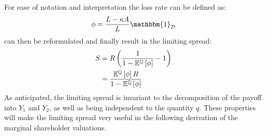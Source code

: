 \documentclass[../main.tex]{subfiles}
\begin{document}
        For ease of notation and interpretation the loss rate can be defined as:
            \begin{equation}
                \phi = \frac{
                        L - \kappa A
                    }{
                        L
                    } 
                \mathbbm{1}_{\mathcal{D}}
                \label{eqn:creditor-loss-rate}
            \end{equation}
         can then be reformulated and finally result in the limiting spread:
            \begin{align}
                    S
                &=
                    R
                    \left(
                        \frac{
                            1   
                        }{
                            1
                            -
                            \mathbb{E}^{\mathbb{Q}}\left[
                                \phi
                            \right]
                        }
                        - 
                        1
                    \right)
                \nonumber \\
                &=
                    \frac{
                        \mathbb{E}^{\mathbb{Q}}\left[\phi\right]
                        R
                    }{
                        1
                        -
                        \mathbb{E}^{\mathbb{Q}}\left[\phi\right]
                    }
            \end{align}
        As anticipated, the limiting spread is invariant to the decomposition of the payoff into $Y_{1}$ and $Y_{2}$,
        as well as being independent to the quantity $q$. 
        These properties will make the limiting spread very useful in the following derivation
        of the marginal shareholder valuations.
        
\end{document}
